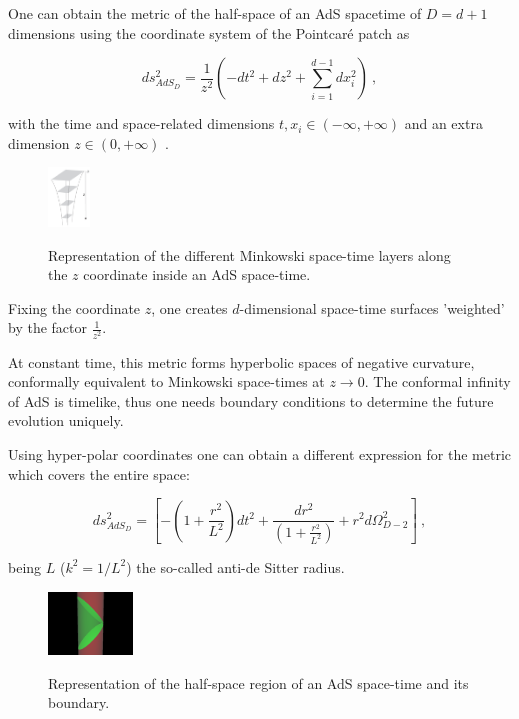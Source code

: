 \documentclass[twocolumn]{revtex4}
\providecommand{\eq}[2]{
    \begin{equation}
        #2
    \label{eq:#1}
    \end{equation}
}
\begin{document}
One can obtain the metric of the half-space of an AdS spacetime of $D=d+1$ dimensions using the coordinate system of the Pointcaré patch as
\eq{AdS_PP-metric}{
    ds_{AdS_D}^2 = \frac{1}{z^2} \left( -dt^2 + dz^2 + \sum_{i=1}^{d-1} dx_i^2 \right) \ ,
}
with the time and space-related dimensions $t , x_i \in (-\infty,+\infty)$ and an extra dimension $z \in (0,+\infty)$ \cite{kaplan_lectures_nodate}.

\begin{figure}
    \centering
    \includegraphics[width=0.1\textwidth]{Imatges/Extern/Captura_Superficies_z.png}
    \label{fig:AdS_z-surfaces}
    \caption{Representation of the different Minkowski space-time layers along the $z$ coordinate inside an AdS space-time.}
\end{figure}

Fixing the coordinate $z$, one creates $d$-dimensional space-time surfaces 'weighted' by the factor $\frac{1}{z^2}$.

At constant time, \cite{} this metric forms hyperbolic spaces of negative curvature, conformally equivalent to Minkowski space-times at $z \to 0$. The conformal infinity of AdS is timelike, thus one needs boundary conditions to determine the future evolution uniquely.

Using hyper-polar coordinates one can obtain a different expression for the metric which covers the entire space:
\eq{AdS_hyper-polar-metric}{
    ds_{AdS_D}^2 = \left [ - \left ( 1 + \frac{r^2}{L^2} \right ) dt^2 + \frac{dr^2}{\left ( 1+ \frac{r^2}{L^2} \right )} + r^2 d \Omega_{D-2}^2 \right ] \ ,
}
being $L$ ($k^2=1/L^2$) the so-called anti-de Sitter radius.

\begin{figure}
    \centering
    \includegraphics[width=0.2\textwidth]{Imatges/Extern/Wikipedia_Half-space_Cilindric.png}
\label{fig:AdS_cylindrical}
\caption{Representation of the half-space region of an AdS space-time and its boundary.}
\end{figure}
\end{document}
